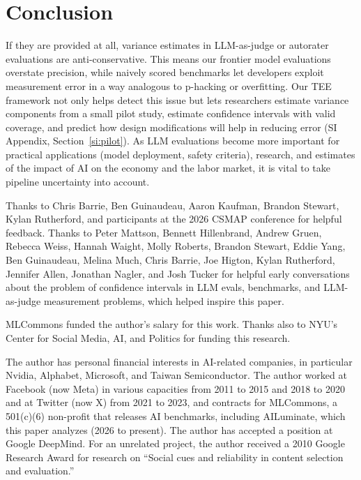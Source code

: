 \documentclass{article}
\begin{document}
\section{Conclusion}
\label{sec:conclusion}

If they are provided at all, variance estimates in LLM-as-judge or autorater evaluations are anti-conservative. This means our frontier model evaluations overstate precision, while naively scored benchmarks let developers exploit measurement error in a way analogous to p-hacking or overfitting. Our TEE framework not only helps detect this issue but lets researchers estimate variance components from a small pilot study, estimate confidence intervals with valid coverage, and predict how design modifications will help in reducing error (SI Appendix, Section~\ref{si:pilot}). As LLM evaluations become more important for practical applications (model deployment, safety criteria), research, and estimates of the impact of AI on the economy and the labor market, it is vital to take pipeline uncertainty into account.

\begin{ack}
Thanks to Chris Barrie, Ben Guinaudeau, Aaron Kaufman, Brandon Stewart, Kylan Rutherford, and participants at the 2026 CSMAP conference for helpful feedback. Thanks to Peter Mattson, Bennett Hillenbrand, Andrew Gruen, Rebecca Weiss, Hannah Waight, Molly Roberts, Brandon Stewart, Eddie Yang, Ben Guinaudeau, Melina Much, Chris Barrie, Joe Higton, Kylan Rutherford, Jennifer Allen, Jonathan Nagler, and Josh Tucker for helpful early conversations about the problem of confidence intervals in LLM evals, benchmarks, and LLM-as-judge measurement problems, which helped inspire this paper.

MLCommons funded the author's salary for this work. Thanks also to NYU's Center for Social Media, AI, and Politics for funding this research.

The author has personal financial interests in AI-related companies, in particular Nvidia, Alphabet, Microsoft, and Taiwan Semiconductor. The author worked at Facebook (now Meta) in various capacities from 2011 to 2015 and 2018 to 2020 and at Twitter (now X) from 2021 to 2023, and contracts for MLCommons, a 501(c)(6) non-profit that releases AI benchmarks, including AILuminate, which this paper analyzes (2026 to present). The author has accepted a position at Google DeepMind. For an unrelated project, the author received a 2010 Google Research Award for research on ``Social cues and reliability in content selection and evaluation.''
\end{ack}




\appendix


\newpage

\end{document}
